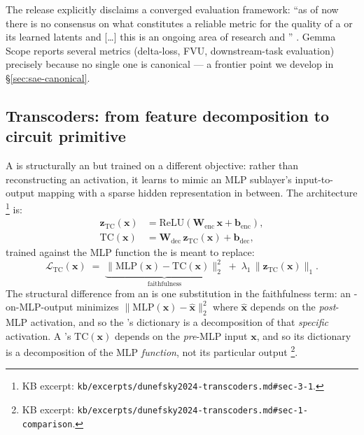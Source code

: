 The release explicitly disclaims a converged evaluation framework:
``as of now there is no consensus on what constitutes a reliable metric
for the quality of a  or its learned latents and
[\dots] this is an ongoing area of research and ''
\citep[\S 4]{gemma-scope-2024}. Gemma Scope reports several metrics
(delta-loss, FVU, downstream-task evaluation) precisely because no
single one is canonical --- a frontier point we develop in
\S\ref{sec:sae-canonical}.

\subsection{Transcoders: from feature decomposition to circuit primitive}
\label{sec:sae-transcoders}

A \emph{} \citep{dunefsky2024-transcoders} is structurally an
 but trained on a different objective: rather than reconstructing an
activation, it learns to mimic an MLP sublayer's input-to-output
mapping with a sparse hidden representation in between. The
architecture
\citep[\S 3.1, Eq.~3--5]{dunefsky2024-transcoders}\footnote{KB excerpt:
\texttt{kb/excerpts/dunefsky2024-transcoders.md\#sec-3-1}.} is:
\begin{align}
  \mathbf{z}_{\text{TC}}(\mathbf{x})
  &= \mathrm{ReLU}\!\left(\mathbf{W}_{\text{enc}}\,\mathbf{x} + \mathbf{b}_{\text{enc}}\right),
  \label{eq:transcoder-encoder}\\
  \mathrm{TC}(\mathbf{x})
  &= \mathbf{W}_{\text{dec}}\,\mathbf{z}_{\text{TC}}(\mathbf{x}) + \mathbf{b}_{\text{dec}},
  \label{eq:transcoder-decoder}
\end{align}
trained against the MLP function the  is meant to replace:
\begin{equation}
  \mathcal{L}_{\text{TC}}(\mathbf{x})
  \;=\;
  \underbrace{\|\mathrm{MLP}(\mathbf{x}) - \mathrm{TC}(\mathbf{x})\|_2^2}_{\text{faithfulness}}
  \;+\;
  \lambda_1\,\|\mathbf{z}_{\text{TC}}(\mathbf{x})\|_1.
  \label{eq:transcoder-loss}
\end{equation}
The structural difference from an  is one substitution in the
faithfulness term: an -on-MLP-output minimizes
$\|\mathrm{MLP}(\mathbf{x}) - \hat{\mathbf{x}}\|_2^2$ where
$\hat{\mathbf{x}}$ depends on the \emph{post}-MLP activation, and so
the 's  dictionary is a decomposition of that
\emph{specific} activation. A 's $\mathrm{TC}(\mathbf{x})$
depends on the \emph{pre}-MLP input $\mathbf{x}$, and so its 
dictionary is a decomposition of the MLP \emph{function}, not its
particular output \citep[\S 1]{dunefsky2024-transcoders}\footnote{KB
excerpt: \texttt{kb/excerpts/dunefsky2024-transcoders.md\#sec-1-comparison}.}.

